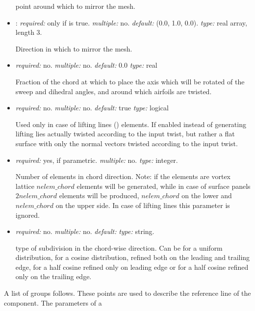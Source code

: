\begin{itemize}
point around which to mirror the mesh.

\item {}: \textit{required:} only if  is true. 
\textit{multiple:} no. \textit{default:} (0.0, 1.0, 0.0). \textit{type:} real array, length 3.

Direction in which to mirror the mesh.

\item {} \textit{required:} no. \textit{multiple:} no. 
\textit{default:} 0.0 \textit{type:} real

Fraction of the chord at which to place the axis which will be rotated of the sweep 
and dihedral angles, and around which airfoils are twisted. 

\item {} \textit{required:} no. \textit{multiple:} no. 
\textit{default:} true \textit{type:} logical

Used only in case of lifting lines () elements. If enabled instead of 
generating lifting lies actually twisted according to the input twist, 
but rather a flat surface with only the normal vectors twisted according 
to the input twist. 

\item {} \textit{required:} yes, if parametric. 
\textit{multiple:} no. \textit{type:} integer.

Number of elements in chord direction. Note: if the elements are vortex 
lattice $nelem\_chord$ elements will be generated, while in case of 
surface panels $2nelem\_chord$ elements will be produced, $nelem\_chord$ 
on the lower and $nelem\_chord$ on the upper side. In case of lifting lines 
this parameter is ignored.

\item {} \textit{required:} no. \textit{multiple:} no. 
\textit{default:}  \textit{type:} string.

type of subdivision in the chord-wise direction. Can be  
for a uniform distribution,  for a cosine distribution, 
refined both on the leading and trailing edge,  for a 
half cosine refined only on leading edge or  for a half 
cosine refined only on the trailing edge. 

\end{itemize}
%
A list of  groups follows. These points are used to 
describe the reference line of the component. The parameters of a 
